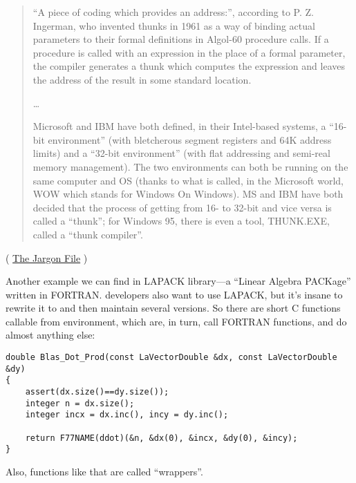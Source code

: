 \begin{framed}
\begin{quotation}
“A piece of coding which provides an address:”, according to P. Z. Ingerman, 
who invented thunks in 1961 as a way of binding actual parameters to their formal 
definitions in Algol-60 procedure calls. If a procedure is called with an expression 
in the place of a formal parameter, the compiler generates a thunk which computes 
the expression and leaves the address of the result in some standard location.

\dots

Microsoft and IBM have both defined, in their Intel-based systems, a “16-bit environment” 
(with bletcherous segment registers and 64K address limits) and a “32-bit environment” 
(with flat addressing and semi-real memory management). The two environments can both be 
running on the same computer and OS (thanks to what is called, in the Microsoft world, 
WOW which stands for Windows On Windows). MS and IBM have both decided that the process 
of getting from 16- to 32-bit and vice versa is called a “thunk”; for Windows 95, 
there is even a tool, THUNK.EXE, called a “thunk compiler”.
\end{quotation}
\end{framed}
( \href{http://go.yurichev.com/17362}{The Jargon File} )

Another example we can find in LAPACK library---a ``Linear Algebra PACKage'' written in FORTRAN.
\CCpp developers also want to use LAPACK, but it's insane to rewrite it to \CCpp and then maintain several versions.
So there are short C functions callable from \CCpp environment, which are, in turn, call FORTRAN functions,
and do almost anything else:

\begin{lstlisting}[style=customc]
double Blas_Dot_Prod(const LaVectorDouble &dx, const LaVectorDouble &dy)
{
    assert(dx.size()==dy.size());
    integer n = dx.size();
    integer incx = dx.inc(), incy = dy.inc();

    return F77NAME(ddot)(&n, &dx(0), &incx, &dy(0), &incy);
}
\end{lstlisting}

Also, functions like that are called ``wrappers''.


